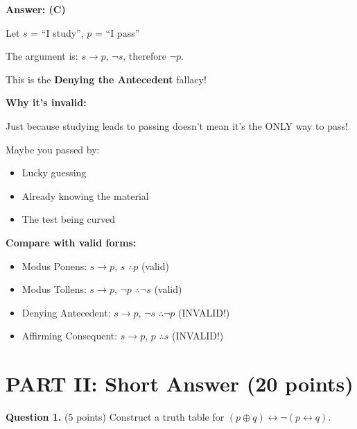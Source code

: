 \documentclass[11pt,a4paper]{article}
\begin{document}
\begin{solnbox}
\textbf{Answer: (C)}

Let $s$ = ``I study'', $p$ = ``I pass''

The argument is: $s \to p$, $\neg s$, therefore $\neg p$.

This is the \textbf{Denying the Antecedent} fallacy!

\textbf{Why it's invalid:}

Just because studying leads to passing doesn't mean it's the ONLY way to pass!

Maybe you passed by:
\begin{itemize}[noitemsep]
    \item Lucky guessing
    \item Already knowing the material
    \item The test being curved
\end{itemize}

\textbf{Compare with valid forms:}
\begin{itemize}[noitemsep]
    \item Modus Ponens: $s \to p$, $s$ $\therefore p$ (valid)
    \item Modus Tollens: $s \to p$, $\neg p$ $\therefore \neg s$ (valid)
    \item Denying Antecedent: $s \to p$, $\neg s$ $\therefore \neg p$ (INVALID!)
    \item Affirming Consequent: $s \to p$, $p$ $\therefore s$ (INVALID!)
\end{itemize}
\end{solnbox}

\newpage

\section*{PART II: Short Answer (20 points)}

\textbf{Question 1.} (5 points) Construct a truth table for $(p \oplus q) \leftrightarrow \neg(p \leftrightarrow q)$.
\end{document}
